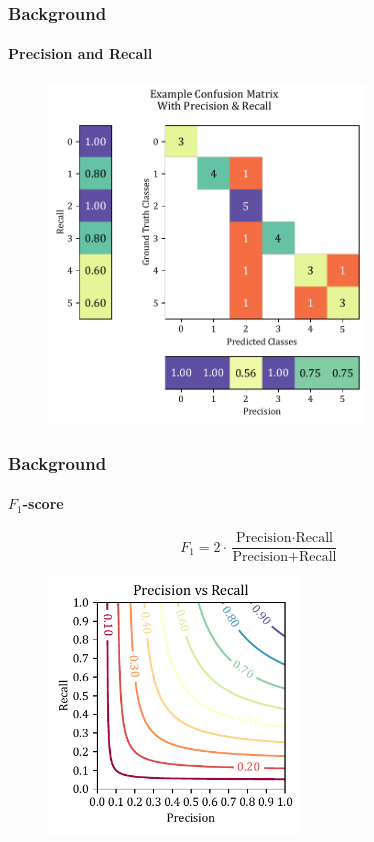 \documentclass[xcolor={svgnames,table},10pt,fleqn]{beamer}
\begin{document}
\begin{frame}
    \frametitle{Background}
    \framesubtitle{Precision and Recall}
    \begin{figure}
        \includegraphics[width=0.75\textwidth]{imgs/conf_mat_prec_recall.pdf}
    \end{figure}
\end{frame}

\begin{frame}
    \frametitle{Background}
    \framesubtitle{$F_1$-score}
    $$
        F_{1} = 2 \cdot \frac{
                \text{Precision} \cdot \text{Recall}
            }{
                \text{Precision} + \text{Recall}
            }
    $$
    \begin{figure}
        \includegraphics[width=0.6\textwidth]{imgs/04_precision_recall_f1.pdf}
    \end{figure}
\end{frame}
\end{document}
